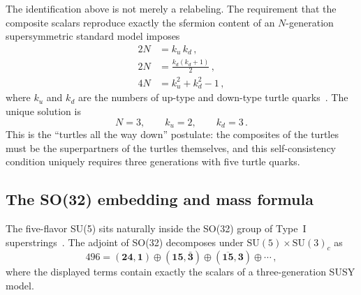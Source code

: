 \documentclass[prd,twocolumn,superscriptaddress,nofootinbib]{revtex4-2}
\begin{document}
The identification above is not merely a relabeling.  The requirement
that the composite scalars reproduce exactly the sfermion content of an
$N$-generation supersymmetric standard model imposes
\begin{align}
  2N &= k_u\,k_d\,, \label{eq:closure1}\\
  2N &= \frac{k_d(k_d+1)}{2}\,, \label{eq:closure2}\\
  4N &= k_u^2 + k_d^2 - 1\,, \label{eq:closure3}
\end{align}
where $k_u$ and $k_d$ are the numbers of up-type and down-type turtle
quarks~\cite{Rivero2007spectroscopy,Rivero2024so32}.  The unique
solution is
\begin{equation}
  N=3,\qquad k_u=2,\qquad k_d=3\,.
  \label{eq:N3}
\end{equation}
This is the ``turtles all the way down'' postulate: the composites of
the turtles must be the superpartners of the turtles themselves, and
this self-consistency condition uniquely requires three generations with
five turtle quarks.

\subsection{The SO(32) embedding and mass formula}
\label{sec:so32}

The five-flavor SU(5) sits naturally inside the SO(32) group of Type~I
superstrings~\cite{Rivero2024so32}.  The adjoint of SO(32) decomposes
under $\text{SU}(5)\times\text{SU}(3)_c$ as
\begin{equation}
  496 = (\mathbf{24},\mathbf{1})
  \oplus (\mathbf{15},\bar{\mathbf{3}})
  \oplus (\overline{\mathbf{15}},\mathbf{3})
  \oplus \cdots\,,
  \label{eq:so32decomp}
\end{equation}
where the displayed terms contain exactly the scalars of a
three-generation SUSY model.
\end{document}
